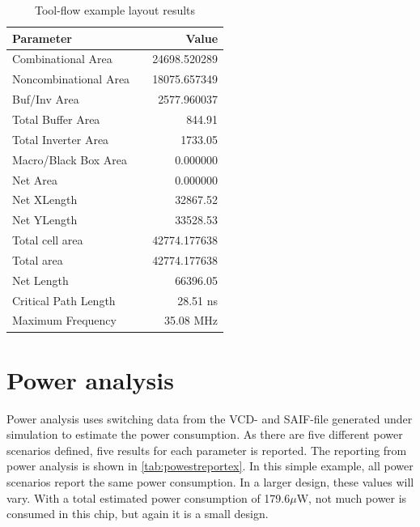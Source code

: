 \begin{table}[hbpt]
    \centering
    \begin{tabular}{lcr}
        \textbf{Parameter} && \textbf{Value} \\
        \toprule
        Combinational Area && 24698.520289 \\
        Noncombinational Area && 18075.657349 \\
        Buf/Inv Area && 2577.960037 \\
        Total Buffer Area && 844.91 \\
        Total Inverter Area && 1733.05 \\
        Macro/Black Box Area && 0.000000 \\
        Net Area && 0.000000 \\
        Net XLength && 32867.52 \\
        Net YLength && 33528.53 \\
        \midrule
        Total cell area && 42774.177638 \\
        Total area && 42774.177638 \\
        Net Length && 66396.05 \\
        \midrule
        Critical Path Length && 28.51 ns \\
        Maximum Frequency && 35.08 MHz\\
        \bottomrule
    \end{tabular}
    \caption{Tool-flow example layout results}
    \label{tab:layoutreportex}
\end{table}

\section{Power analysis}
Power analysis uses switching data from the VCD- and SAIF-file generated under simulation to estimate the power consumption. As there are five different power scenarios defined, five results for each parameter is reported. The reporting from power analysis is shown in \cref{tab:powestreportex}. In this simple example, all power scenarios report the same power consumption. In a larger design, these values will vary. With a total estimated power consumption of 179.6$\mu$W, not much power is consumed in this chip, but again it is a small design.

